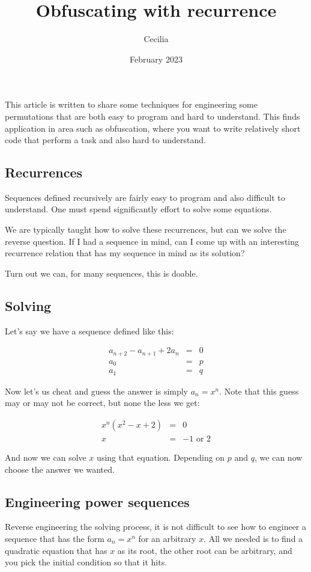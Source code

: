 \documentclass{article}
\title{Obfuscating with recurrence}
\author{Cecilia}
\date{February 2023}
\begin{document}
\maketitle
This article is written to share some techniques for engineering some permutations that are both easy to program and hard to understand. This finds application in area such as obfuscation, where you want to write relatively short code that perform a task and also hard to understand.

\subsection*{Recurrences}
Sequences defined recursively are fairly easy to program and also difficult to understand. One must spend significantly effort to solve some equations.

We are typically taught how to solve these recurrences, but can we solve the reverse question. If I had a sequence in mind, can I come up with an interesting recurrence relation that has my sequence in mind as its solution?

Turn out we can, for many sequences, this is doable.

\subsection*{Solving}
Let's say we have a sequence defined like this:

\begin{eqnarray*}
  a_{n+2} - a_{n+1} + 2a_n &=& 0 \\
  a_0 &=& p \\
  a_1 &=& q
\end{eqnarray*}

Now let's us cheat and guess the answer is simply $ a_n = x^n $. Note that this guess may or may not be correct, but none the less we get:

\begin{eqnarray*}
  x^n(x^2 - x + 2) &=& 0 \\
  x &=& -1 \text{ or } 2
\end{eqnarray*}

And now we can solve $ x $ using that equation. Depending on $ p $ and $ q $, we can now choose the answer we wanted.

\subsection*{Engineering power sequences}
Reverse engineering the solving process, it is not difficult to see how to engineer a sequence that has the form $ a_n = x^n $ for an arbitrary $ x $. All we needed is to find a quadratic equation that has $ x $ as its root, the other root can be arbitrary, and you pick the initial condition so that it hits.
\end{document}
